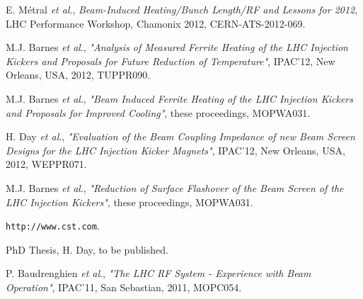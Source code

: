 \documentclass{JAC2003}
\begin{document}
\begin{thebibliography}{9}
E. Métral \emph{et al}., \emph{Beam-Induced Heating/Bunch Length/RF and Lessons for 2012}, LHC Performance Workshop, Chamonix 2012, CERN-ATS-2012-069. 

M.J. Barnes \emph{et al}., \emph{"Analysis of Measured Ferrite Heating of the LHC Injection Kickers and Proposals for Future Reduction of Temperature"}, IPAC'12, New Orleans, USA, 2012, TUPPR090.

 M.J. Barnes \emph{et al}., \emph{"Beam Induced Ferrite Heating of the LHC Injection Kickers and Proposals for Improved Cooling"}, these proceedings, MOPWA031.

H. Day \emph{et al}., \emph{"Evaluation of the Beam Coupling Impedance of new Beam Screen Designs for the LHC Injection Kicker Magnets"}, IPAC'12, New Orleans, USA, 2012, WEPPR071.

M.J. Barnes \emph{et al}., \emph{"Reduction of Surface Flashover of the Beam Screen of the LHC Injection Kickers"}, these proceedings, MOPWA031.

\texttt{http://www.cst.com}.

PhD Thesis, H. Day, to be published.

P. Baudrenghien \emph{et al}., \emph{"The LHC RF System - Experience with Beam Operation"}, IPAC'11, San Sebastian, 2011, MOPC054.


\end{thebibliography}
\end{document}
